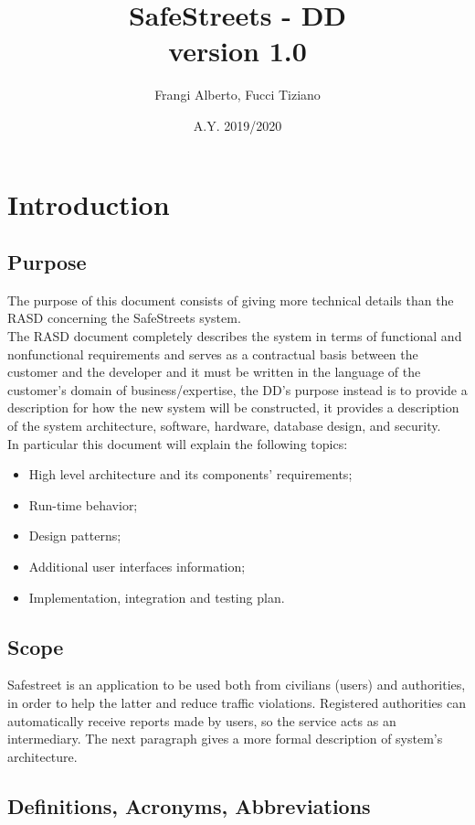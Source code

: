 \documentclass[12pt,a4paper]{report}
\title{SafeStreets - DD \\ \large version 1.0}
\author{Frangi Alberto, Fucci Tiziano}
\date{A.Y. 2019/2020}
\begin{document}
	\maketitle
	\tableofcontents
	\chapter{Introduction}
		\section{Purpose}
			The purpose of this document consists of giving more technical details than the RASD concerning the SafeStreets
			system.\\
			The RASD document completely describes the system in terms of functional and nonfunctional requirements and
			serves as a contractual basis between the customer and the developer and it must be written in the language of
			the customer's domain of business/expertise, the DD's purpose instead is to provide a description for how the new
			system will be constructed, it provides a description of the system architecture, software, hardware, database
			design, and security.\\
			In particular this document will explain the following topics:
			\begin{itemize}
				\item High level architecture and its components' requirements;
				\item Run-time behavior;
				\item Design patterns;
				\item Additional user interfaces information;
				\item Implementation, integration and testing plan.
			\end{itemize}
		\section{Scope}
			Safestreet is an application to be used both from civilians (users) and authorities, in order to help the latter and
			reduce traffic violations. Registered authorities can automatically receive reports made by users, so the service acts
			as an intermediary. The next paragraph gives a more formal description of system's architecture.

		\section{Definitions, Acronyms, Abbreviations}
\end{document}
